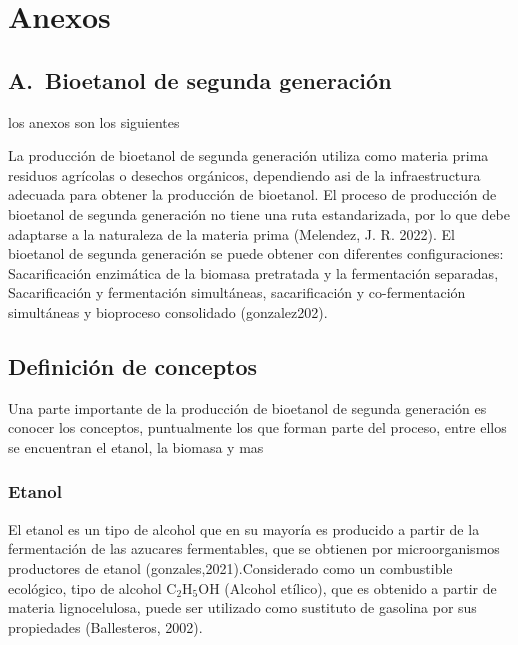 \documentclass[12pt]{article}
\begin{document}
\section*{Anexos}		
		
\setcounter{anexo}{0}

\subsection*{A.\theanexo\ Bioetanol de segunda generación}
	

		los anexos son los siguientes
		\label{marco conceptual}
		
		
		
		La producción de bioetanol de segunda generación utiliza como materia prima residuos agrícolas o desechos orgánicos, dependiendo asi de la infraestructura adecuada para obtener la producción de bioetanol. El proceso de producción de bioetanol de segunda generación no tiene una ruta estandarizada, por lo que debe adaptarse a la naturaleza de la materia prima \cite{melendez2022biotecnologia} (Melendez, J. R. 2022). El bioetanol de segunda generación se puede obtener con diferentes configuraciones: Sacarificación enzimática de la biomasa pretratada y la fermentación separadas, Sacarificación y fermentación simultáneas, sacarificación y co-fermentación simultáneas y bioproceso consolidado (gonzalez202).
		
	
		\subsection{ Definición de conceptos }
		
		
		Una parte  importante de la producción de bioetanol de segunda generación es conocer los conceptos, puntualmente los que forman parte del proceso, entre ellos se encuentran el etanol, la biomasa y mas 
		\subsubsection{Etanol}
		El etanol es un tipo de alcohol que en su mayoría es producido a partir de la  fermentación de las azucares fermentables, que se obtienen por microorganismos productores de etanol \cite{} (gonzales,2021).Considerado como un combustible ecológico, tipo de alcohol $\text{C}_2\text{H}_5\text{OH}$ (Alcohol etílico), que es obtenido a partir de materia lignocelulosa, puede ser utilizado como sustituto de gasolina por sus propiedades (Ballesteros, 2002).
		
\end{document}
